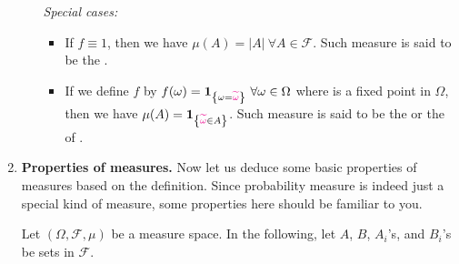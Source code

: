 \begin{enumerate}
\begin{enumerate}
\emph{Special cases:}
\begin{itemize}
\item If \(f\equiv 1\), then we have \(\mu(A)=|A|~\forall A\in\mathcal{F}\).
Such measure is said to be the .
\item If we define \(f\) by
\(f(\omega)=\indicset{\omega=\mgc{\widetilde{\omega}}}~\forall \omega\in\Omega\)
where \mgc{\(\widetilde{\omega}\)} is a fixed point in \(\Omega\), then we have
\(\mu(A)=\indicset{\mgc{\widetilde{\omega}}\in A}\). Such measure is said to be the
 or the  of \mgc{\(\widetilde{\omega}\)}.
\end{itemize}
\end{enumerate}
\item \label{it:meas-prop} \textbf{Properties of measures.} Now let us deduce
some basic properties of measures based on the definition. Since probability
measure is indeed just a special kind of measure, some properties here should
be familiar to you.

Let \((\Omega,\mathcal{F},\mu)\) be a measure space.  In the following, let
\(A\), \(B\), \(A_i\)'s, and \(B_i\)'s be sets in \(\mathcal{F}\).


\end{enumerate}
